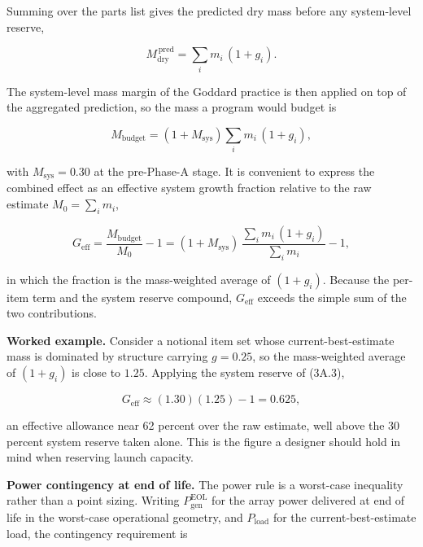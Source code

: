 \documentclass[
  11pt,
  openany,
  oneside]{book}
\begin{document}
Summing over the parts list gives the predicted dry mass before any
system-level reserve,

\begin{equation}
M_{\mathrm{dry}}^{\,\mathrm{pred}} = \sum_i m_i\,(1 + g_i). \tag{3A.2}
\end{equation}

The system-level mass margin of the Goddard practice is then applied on
top of the aggregated prediction, so the mass a program would budget is

\begin{equation}
M_{\mathrm{budget}} = (1 + M_{\mathrm{sys}})\sum_i m_i\,(1 + g_i), \tag{3A.3}
\end{equation}

with \(M_{\mathrm{sys}} = 0.30\) at the pre-Phase-A stage. It is
convenient to express the combined effect as an effective system growth
fraction relative to the raw estimate \(M_0 = \sum_i m_i\),

\begin{equation}
G_{\mathrm{eff}} = \frac{M_{\mathrm{budget}}}{M_0} - 1 = (1 + M_{\mathrm{sys}})\,\frac{\sum_i m_i\,(1 + g_i)}{\sum_i m_i} - 1, \tag{3A.4}
\end{equation}

in which the fraction is the mass-weighted average of \((1 + g_i)\).
Because the per-item term and the system reserve compound,
\(G_{\mathrm{eff}}\) exceeds the simple sum of the two contributions.

\textbf{Worked example.} Consider a notional item set whose
current-best-estimate mass is dominated by structure carrying
\(g = 0.25\), so the mass-weighted average of \((1 + g_i)\) is close to
\(1.25\). Applying the system reserve of (3A.3),

\begin{equation}
G_{\mathrm{eff}} \approx (1.30)(1.25) - 1 = 0.625, \tag{3A.5}
\end{equation}

an effective allowance near 62 percent over the raw estimate, well above
the 30 percent system reserve taken alone. This is the figure a designer
should hold in mind when reserving launch capacity.

\textbf{Power contingency at end of life.} The power rule is a
worst-case inequality rather than a point sizing. Writing
\(P_{\mathrm{gen}}^{\mathrm{EOL}}\) for the array power delivered at end
of life in the worst-case operational geometry, and
\(P_{\mathrm{load}}\) for the current-best-estimate load, the
contingency requirement is
\end{document}

